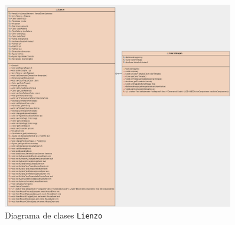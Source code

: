 \begin{figure}
 \centering
  \includegraphics[width=0.9\textwidth]{diagramas/lienzo.png}
 \caption{Diagrama de clases \texttt{Lienzo}}
 \label{diseño}
 \end{figure}
